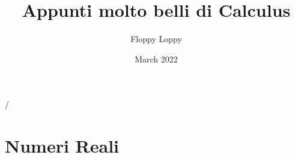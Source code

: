 \documentclass[a4paper]{article}
\theoremstyle{definition}
\begin{document}
\title{Appunti molto belli di Calculus}
\author{Floppy Loppy}
\date{March 2022}
\maketitle
\tableofcontents
\newpage
\listoftodos/



\newpage
\section{Numeri Reali}\label{sec:introduzione}



%
%
%
%
%
%
%
%
%
%
%
%
%
%
%
%
%
%
%
\end{document}
